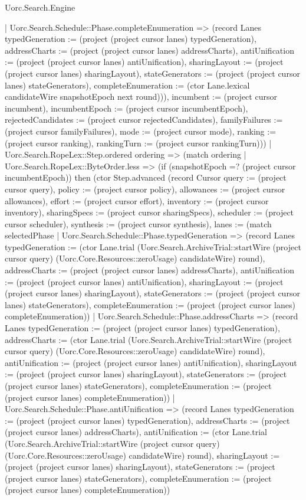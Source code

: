 \begin{lexlean}{Uorc.Search.Engine}
\begin{semanticmodule}
{{        | Uorc.Search.Schedule::Phase.completeEnumeration => (record Lanes {typedGeneration := (project (project cursor lanes) typedGeneration), addressCharts := (project (project cursor lanes) addressCharts), antiUnification := (project (project cursor lanes) antiUnification), sharingLayout := (project (project cursor lanes) sharingLayout), stateGenerators := (project (project cursor lanes) stateGenerators), completeEnumeration := (ctor Lane.lexical candidateWire snapshotEpoch next round)})), incumbent := (project cursor incumbent), incumbentEpoch := (project cursor incumbentEpoch), rejectedCandidates := (project cursor rejectedCandidates), familyFailures := (project cursor familyFailures), mode := (project cursor mode), ranking := (project cursor ranking), rankingTurn := (project cursor rankingTurn)}))
      | Uorc.Search.RopeLex::Step.ordered ordering => (match ordering
        | Uorc.Search.RopeLex::ByteOrder.less => (if (snapshotEpoch =? (project cursor incumbentEpoch)) then (ctor Step.advanced (record Cursor {query := (project cursor query), policy := (project cursor policy), allowances := (project cursor allowances), effort := (project cursor effort), inventory := (project cursor inventory), sharingSpecs := (project cursor sharingSpecs), scheduler := (project cursor scheduler), synthesis := (project cursor synthesis), lanes := (match selectedPhase
          | Uorc.Search.Schedule::Phase.typedGeneration => (record Lanes {typedGeneration := (ctor Lane.trial (Uorc.Search.ArchiveTrial::startWire (project cursor query) (Uorc.Core.Resources::zeroUsage) candidateWire) round), addressCharts := (project (project cursor lanes) addressCharts), antiUnification := (project (project cursor lanes) antiUnification), sharingLayout := (project (project cursor lanes) sharingLayout), stateGenerators := (project (project cursor lanes) stateGenerators), completeEnumeration := (project (project cursor lanes) completeEnumeration)})
          | Uorc.Search.Schedule::Phase.addressCharts => (record Lanes {typedGeneration := (project (project cursor lanes) typedGeneration), addressCharts := (ctor Lane.trial (Uorc.Search.ArchiveTrial::startWire (project cursor query) (Uorc.Core.Resources::zeroUsage) candidateWire) round), antiUnification := (project (project cursor lanes) antiUnification), sharingLayout := (project (project cursor lanes) sharingLayout), stateGenerators := (project (project cursor lanes) stateGenerators), completeEnumeration := (project (project cursor lanes) completeEnumeration)})
          | Uorc.Search.Schedule::Phase.antiUnification => (record Lanes {typedGeneration := (project (project cursor lanes) typedGeneration), addressCharts := (project (project cursor lanes) addressCharts), antiUnification := (ctor Lane.trial (Uorc.Search.ArchiveTrial::startWire (project cursor query) (Uorc.Core.Resources::zeroUsage) candidateWire) round), sharingLayout := (project (project cursor lanes) sharingLayout), stateGenerators := (project (project cursor lanes) stateGenerators), completeEnumeration := (project (project cursor lanes) completeEnumeration)})
}}
\end{semanticmodule}
\end{lexlean}

